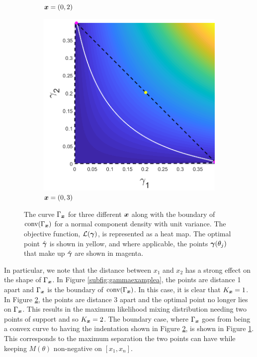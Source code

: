 \begin{figure}[ht]
\begin{subfigure}[t]{0.32\textwidth}
			\caption{${\bm{{x}}} = (0,2)$} \label{subfig:gammaexampleb}
		\end{subfigure}
		\begin{subfigure}[t]{0.32\textwidth}
			\centering
			\includegraphics[width = \textwidth]{Sigma1x1_0-x2_3}
			\caption{${\bm{{x}}} = (0,3)$} \label{subfig:gammaexamplec}
		\end{subfigure}
		\caption[The curve $\Gamma_\vect{x}$ for three different $\vect{x}$ along with the boundary of $\conv(\Gamma_\vect{x})$ for a normal component density with unit variance.]{The curve $\Gamma_\vect{x}$ for three different $\vect{x}$ along with the boundary of $\conv(\Gamma_\vect{x})$ for a normal component density with unit variance. The objective function, $\mathcal{L}({\bm{{\gamma}}})$, is represented as a heat map. The optimal point $\hat{{\bm{{\gamma}}}}$ is shown in yellow, and where applicable, the points ${\bm{{\gamma}}}(\theta_j)$ that make up $\hat{{\bm{{\gamma}}}}$ are shown in magenta.}
		\label{fig:Gammaexample}
	\end{figure}
%
	In particular, we note that the distance between $x_1$ and $x_2$ has a strong effect on the shape of $\Gamma_\vect{x}$. In Figure \ref{subfig:gammaexamplea}, the points are distance 1 apart and $\Gamma_\vect{x}$ is the boundary of $\conv(\Gamma_\vect{x})$. In this case, it is clear that $K_{\bm{{x}}} = 1$. In Figure \ref{subfig:gammaexamplec}, the points are distance 3 apart and the optimal point no longer lies on $\Gamma_\vect{x}$. This results in the maximum likelihood mixing distribution needing two points of support and so $K_{\bm{{x}}} = 2$. The boundary case, where $\Gamma_\vect{x}$ goes from being a convex curve to having the indentation shown in Figure \ref{subfig:gammaexamplec}, is shown in Figure \ref{subfig:gammaexampleb}. This corresponds to the maximum separation the two points can have while keeping $M(\theta)$ non-negative on $[x_1, x_n]$.


